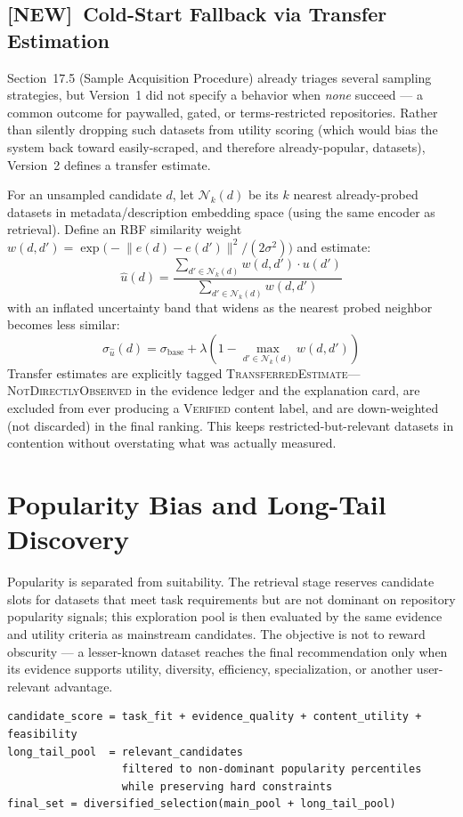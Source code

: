 \documentclass[11pt]{article}
\newcommand{\newtag}{\textcolor{accent}{\textbf{[NEW]}}\ }
\begin{document}
\subsection{\newtag Cold-Start Fallback via Transfer Estimation}
\label{sec:coldstart}
Section~17.5 (Sample Acquisition Procedure) already triages several sampling strategies, but Version~1 did
not specify a behavior when \emph{none} succeed --- a common outcome for paywalled, gated, or
terms-restricted repositories. Rather than silently dropping such datasets from utility scoring (which
would bias the system back toward easily-scraped, and therefore already-popular, datasets), Version~2
defines a transfer estimate.

For an unsampled candidate $d$, let $\mathcal{N}_k(d)$ be its $k$ nearest already-probed datasets in
metadata/description embedding space (using the same encoder as retrieval). Define an RBF similarity
weight $w(d,d') = \exp\!\big(-\lVert e(d)-e(d')\rVert^2 / (2\sigma^2)\big)$ and estimate:
\begin{equation}
\hat{u}(d) = \frac{\sum_{d' \in \mathcal{N}_k(d)} w(d,d') \cdot u(d')}{\sum_{d' \in \mathcal{N}_k(d)} w(d,d')}
\end{equation}
with an inflated uncertainty band that widens as the nearest probed neighbor becomes less similar:
\begin{equation}
\sigma_{\hat{u}}(d) = \sigma_{\text{base}} + \lambda \left(1 - \max_{d' \in \mathcal{N}_k(d)} w(d,d')\right)
\end{equation}
Transfer estimates are explicitly tagged \textsc{TransferredEstimate---NotDirectlyObserved} in the
evidence ledger and the explanation card, are excluded from ever producing a \textsc{Verified} content
label, and are down-weighted (not discarded) in the final ranking. This keeps restricted-but-relevant
datasets in contention without overstating what was actually measured.

\section{Popularity Bias and Long-Tail Discovery}
Popularity is separated from suitability. The retrieval stage reserves candidate slots for datasets that
meet task requirements but are not dominant on repository popularity signals; this exploration pool is
then evaluated by the same evidence and utility criteria as mainstream candidates. The objective is not to
reward obscurity --- a lesser-known dataset reaches the final recommendation only when its evidence
supports utility, diversity, efficiency, specialization, or another user-relevant advantage.
\begin{lstlisting}[basicstyle=\ttfamily\footnotesize]
candidate_score = task_fit + evidence_quality + content_utility + feasibility
long_tail_pool  = relevant_candidates
                  filtered to non-dominant popularity percentiles
                  while preserving hard constraints
final_set = diversified_selection(main_pool + long_tail_pool)
\end{lstlisting}
\end{document}
